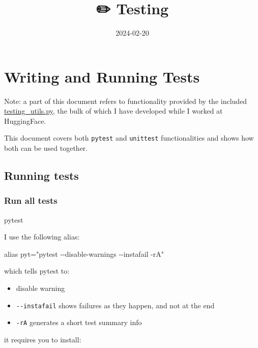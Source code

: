 \documentclass[
]{report}
\title{✏️ Testing}
\author{}
\date{2024-02-20}
\newenvironment{Shaded}{\begin{snugshade}}{\end{snugshade}}
\newcommand{\BuiltInTok}[1]{\textcolor[rgb]{0.00,0.23,0.31}{#1}}
\newcommand{\ExtensionTok}[1]{\textcolor[rgb]{0.00,0.23,0.31}{#1}}
\newcommand{\NormalTok}[1]{\textcolor[rgb]{0.00,0.23,0.31}{#1}}
\newcommand{\StringTok}[1]{\textcolor[rgb]{0.13,0.47,0.30}{#1}}
\providecommand{\tightlist}{%
  \setlength{\itemsep}{0pt}\setlength{\parskip}{0pt}}\usepackage{longtable,booktabs,array}
\begin{document}
\maketitle

\chapter{Writing and Running Tests}\label{writing-and-running-tests}

Note: a part of this document refers to functionality provided by the
included \url{testing_utils.py}, the bulk of which I have developed
while I worked at HuggingFace.

This document covers both \texttt{pytest} and \texttt{unittest}
functionalities and shows how both can be used together.

\section{Running tests}\label{running-tests}

\subsection{Run all tests}\label{run-all-tests}

\begin{Shaded}
\begin{Highlighting}[]
\ExtensionTok{pytest}
\end{Highlighting}
\end{Shaded}

I use the following alias:

\begin{Shaded}
\begin{Highlighting}[]
\BuiltInTok{alias}\NormalTok{ pyt=}\StringTok{"pytest {-}{-}disable{-}warnings {-}{-}instafail {-}rA"}
\end{Highlighting}
\end{Shaded}

which tells pytest to:

\begin{itemize}
\tightlist
\item
  disable warning
\item
  \texttt{-\/-instafail} shows failures as they happen, and not at the
  end
\item
  \texttt{-rA} generates a short test summary info
\end{itemize}

it requires you to install:
\end{document}
